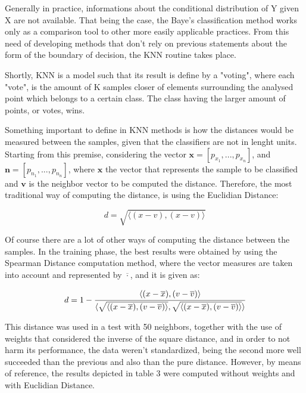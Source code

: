 \documentclass[conference]{IEEEtran}
\begin{document}
Generally in practice, informations about the conditional distribution of Y given X 
are not available. That being the case, the Baye's classification method works only as 
a comparison tool to other more easily applicable practices. From this need of developing 
methods that don't rely on previous statements about the form of the boundary of decision,
the KNN routine takes place.

Shortly, KNN is a model such that its result is define by a "voting", where each "vote", 
is the amount of K samples closer of elements surrounding the analysed point which belongs
to a certain class. The class having the larger amount of points, or votes, wins. 

Something important to define in KNN methods is how the distances would be measured between
the samples, given that the classifiers are not in lenght units. Starting from this premise,
considering the vector $\textbf{x} = [p_{x_1}, ..., p_{x_n}]$, and $\textbf{n} = [p_{n_1}, ..., p_{n_n}]$, 
where $\textbf{x}$ the vector that represents the sample to be classified and $\textbf{v}$
is the neighbor vector to be computed the distance. Therefore, the most traditional way 
of computing the distance, is using the Euclidian Distance:

\begin{equation}
    d = \sqrt{\langle (x-v), (x-v)\rangle} \label{eq16}
\end{equation}

Of course there are a lot of other ways of computing the distance between the samples. 
In the training phase, the best results were obtained by using the Spearman Distance computation
method, where the vector measures are taken into account and represented by $\overline{\cdot}$, and it is 
given as: 

\begin{equation}
    d = 1 - \cfrac{\langle (x-\overline{x}), (v - \overline{v})\rangle}{\langle \sqrt{\langle (x-\overline{x}), (v - \overline{v})\rangle}, \sqrt{\langle (x-\overline{x}), (v - \overline{v})\rangle}\rangle}
\end{equation}

This distance was used in a test with 50 neighbors, together with the use of weights that
considered the inverse of the square distance, and in order to not harm its performance, the data weren't standardized, being the second more well succeeded than
the previous and also than the pure distance. However, by means of reference, the results 
depicted in table 3 were computed without weights and with Euclidian Distance.
\end{document}
